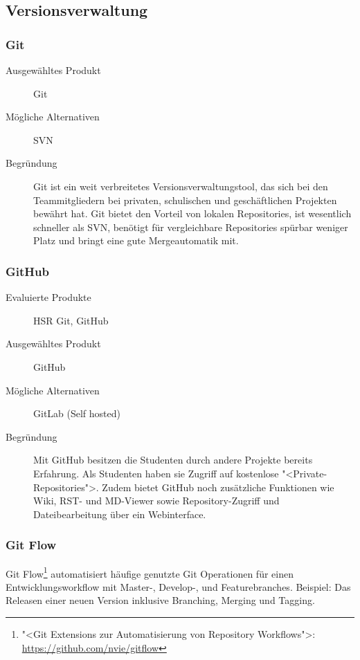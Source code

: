 		\subsection{Versionsverwaltung}
			\subsubsection{Git}
				\begin{description}
					\item[Ausgewähltes Produkt] Git
					\item[Mögliche Alternativen] SVN
					\item[Begründung] Git ist ein weit verbreitetes Versionsverwaltungstool, das sich bei den Teammitgliedern bei privaten, schulischen und geschäftlichen Projekten bewährt hat. Git bietet den Vorteil von lokalen Repositories, ist wesentlich schneller als SVN, benötigt für vergleichbare Repositories spürbar weniger Platz und bringt eine gute Mergeautomatik mit.
				\end{description}

			\subsubsection{GitHub}
				\begin{description}
					\item[Evaluierte Produkte] HSR Git, GitHub
					\item[Ausgewähltes Produkt] GitHub
					\item[Mögliche Alternativen] GitLab (Self hosted)
					\item[Begründung] Mit GitHub besitzen die Studenten durch andere Projekte bereits Erfahrung. 
						Als Studenten haben sie Zugriff auf kostenlose "<Private-Repositories">. 
						Zudem bietet GitHub noch zusätzliche Funktionen wie Wiki, RST- und MD-Viewer sowie
						Repository-Zugriff und Dateibearbeitung über ein Webinterface.
				\end{description}
				
			\subsubsection{Git Flow}
				Git Flow\footnote{"<Git Extensions zur Automatisierung von Repository Workflows">: \url{https://github.com/nvie/gitflow}} automatisiert häufige genutzte Git Operationen für einen Entwicklungsworkflow \cite{driessen_successful_2010} mit Master-, Develop-, und Featurebranches.
				Beispiel: Das Releasen einer neuen Version inklusive Branching, Merging und Tagging.
				
